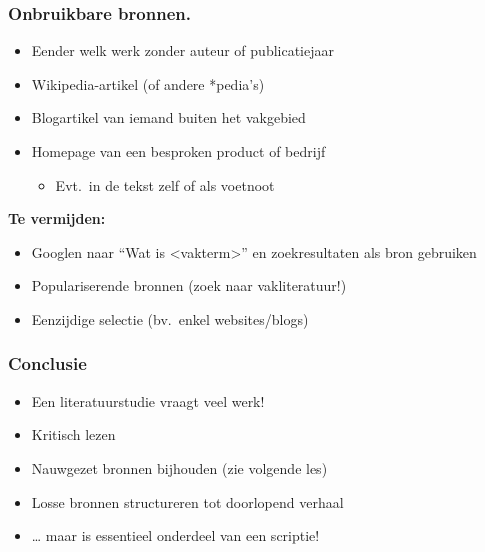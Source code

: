 \documentclass[aspectratio=169]{beamer}
\begin{document}
\begin{frame}
  \frametitle{Onbruikbare bronnen.}

  \begin{itemize}
    \item Eender welk werk zonder auteur of publicatiejaar
    \item Wikipedia-artikel (of andere *pedia's)
    \item Blogartikel van iemand buiten het vakgebied
    \item Homepage van een besproken product of bedrijf
          \begin{itemize}
            \item Evt.~in de tekst zelf of als voetnoot
          \end{itemize}
  \end{itemize}

  \textbf{Te vermijden:}

  \begin{itemize}
    \item Googlen naar ``Wat is <vakterm>'' en zoekresultaten als bron gebruiken
    \item Populariserende bronnen (zoek naar vakliteratuur!)
    \item Eenzijdige selectie (bv.~enkel websites/blogs)
  \end{itemize}
\end{frame}

\begin{frame}
  \frametitle{Conclusie}

  \begin{itemize}
    \item Een literatuurstudie vraagt veel werk!
    \item Kritisch lezen
    \item Nauwgezet bronnen bijhouden (zie volgende les)
    \item Losse bronnen structureren tot doorlopend verhaal
    \item \ldots{} maar is essentieel onderdeel van een scriptie!
  \end{itemize}

\end{frame}
\end{document}
